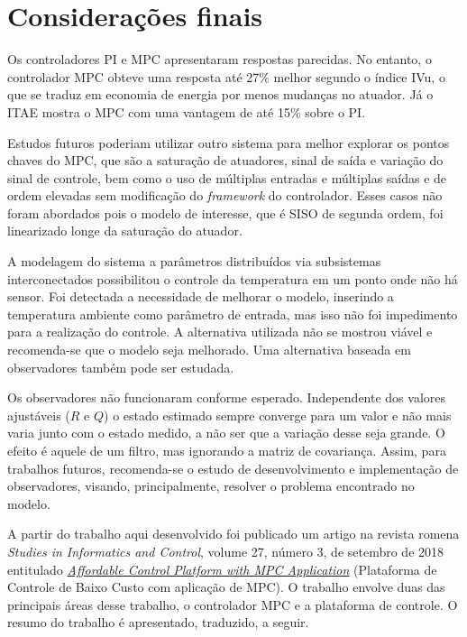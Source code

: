 
\chapter{Considerações finais}%
\label{chp:conclusion}

Os controladores PI e MPC apresentaram respostas parecidas. No entanto, o
controlador MPC obteve uma resposta até 27\% melhor segundo o índice IVu, o que
se traduz em economia de energia por menos mudanças no atuador. Já o ITAE mostra
o MPC com uma vantagem de até 15\% sobre o PI.\@

Estudos futuros poderiam utilizar outro sistema para melhor explorar os pontos
chaves do MPC, que são a saturação de atuadores, sinal de saída e variação do
sinal de controle, bem como o uso de múltiplas entradas e múltiplas saídas e de
ordem elevadas sem modificação do \textit{framework} do controlador. Esses casos
não foram abordados pois o modelo de interesse, que é SISO de segunda ordem, foi
linearizado longe da saturação do atuador.

A modelagem do sistema a parâmetros distribuídos via subsistemas interconectados
possibilitou o controle da temperatura em um ponto onde não há sensor. Foi
detectada a necessidade de melhorar o modelo, inserindo a temperatura ambiente
como parâmetro de entrada, mas isso não foi impedimento para a realização do
controle. A alternativa utilizada não se mostrou viável e recomenda-se que o
modelo seja melhorado. Uma alternativa baseada em observadores também pode ser
estudada.

Os observadores não funcionaram conforme esperado. Independente dos valores
ajustáveis (\(R\) e \(Q\)) o estado estimado sempre converge para um valor e não
mais varia junto com o estado medido, a não ser que a variação desse seja
grande. O efeito é aquele de um filtro, mas ignorando a matriz de covariança.
Assim, para trabalhos futuros, recomenda-se o estudo de desenvolvimento e
implementação de observadores, visando, principalmente, resolver o problema
encontrado no modelo.

A partir do trabalho aqui desenvolvido foi publicado um artigo na revista romena
\textit{Studies in Informatics and Control}, volume 27, número 3, de setembro de
2018 entitulado \href{https://doi.org/10.24846/v27i3y201802}{\textit{Affordable
Control Platform with MPC Application}} (Plataforma de Controle de Baixo Custo
com aplicação de MPC). O trabalho envolve duas das principais áreas desse
trabalho, o controlador MPC e a plataforma de controle. O resumo do trabalho é
apresentado, traduzido, a seguir.

